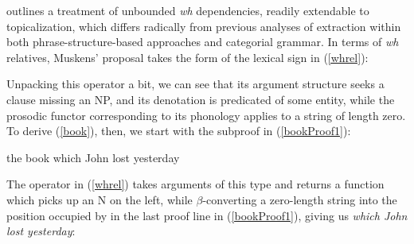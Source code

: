 \documentclass[output=paper,colorlinks,citecolor=brown]{langscibook}
\begin{document}
\citet{muskens03} outlines a treatment of unbounded \textit{wh} dependencies,
readily extendable to topicalization, which differs radically from
previous analyses of extraction within both phrase-structure-based
approaches and categorial grammar. In terms of \textit{wh} relatives,
Muskens' proposal takes the form of the lexical sign in (\ref{whrel}):

\begin{exe}
 \ex\label{whrel}
  \LexEnt{\pt{\ensuremath{\lambda} \ensuremath{\greeks}. which \BobsO \ensuremath{\greeks}(\E)}}{\sem{ λP λQ λw. P(w) \ensuremath{ \wedge\xspace } Q(w)}}{\syncat{(N\bsl{}N)\vs (S\vs NP)}}
\end{exe}
Unpacking this operator a bit, we can see that its argument structure
seeks a clause missing an NP, and its denotation is predicated of
some entity, while the prosodic functor corresponding to its phonology
applies to a string of length zero. To derive (\ref{book}), then, we start
with the subproof in (\ref{bookProof1}):

\begin{exe}
 \ex\label{book}
  the book which John lost yesterday
\end{exe}
\begin{exe}
 \ex\label{bookProof1}
\end{exe}
The operator in (\ref{whrel}) takes arguments of this type and returns a
function which picks up an N on the left, while $\beta$-converting a
zero-length string into the position occupied by  in the last
proof line in (\ref{bookProof1}), giving us \textit{which John lost yesterday}:
\end{document}
